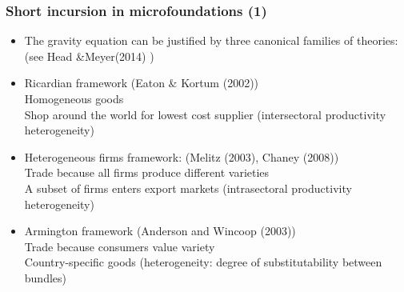 \documentclass{beamer}
\begin{document}
\begin{frame}[plain]\frametitle{Short incursion in microfoundations (1)}
\begin{itemize}
\item The gravity equation can be justified by three canonical families of theories: (see Head \&Meyer(2014) )
\item Ricardian framework (Eaton \& Kortum (2002))
\\ Homogeneous goods
\\ Shop around the world for lowest cost supplier (intersectoral productivity heterogeneity)
\item Heterogeneous firms framework: (Melitz (2003),  Chaney (2008))
\\ Trade because all firms produce different varieties
\\ A subset of firms enters export markets (intrasectoral productivity heterogeneity)
\vspace{0.3cm}
\item Armington framework (Anderson and Wincoop (2003))
\\ Trade because consumers value variety 
\\ Country-specific goods (heterogeneity: degree of substitutability between bundles)
\end{itemize}
\end{frame}
\end{document}
